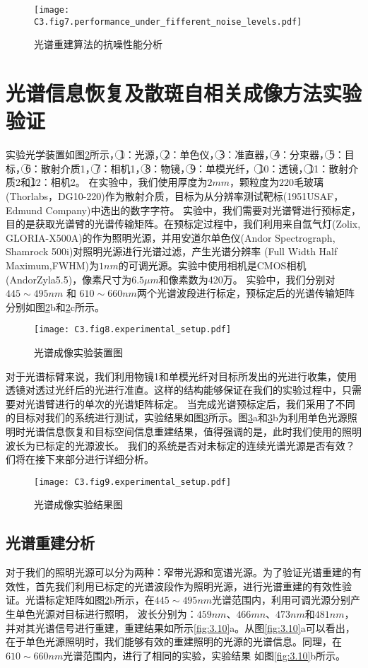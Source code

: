 \begin{figure}[htp]
	\centering
	\texttt{[image: C3.fig7.performance\_under\_fifferent\_noise\_levels.pdf]}
	\caption{光谱重建算法的抗噪性能分析}
	\label{fig:3.7}
\end{figure}

\section{光谱信息恢复及散斑自相关成像方法实验验证}
实验光学装置如图\ref{fig:3.8}所示，\textcircled{1}：光源，\textcircled{2}：单色仪，\textcircled{3}：准直器，\textcircled{4}：分束器，\textcircled{5}：目标，\textcircled{6}：散射介质1，\textcircled{7}：相机1，\textcircled{8}：物镜，\textcircled{9}：单模光纤，
\textcircled{10}：透镜，\textcircled{11}：散射介质2和\textcircled{12}：相机2。
在实验中，我们使用厚度为$2mm$，颗粒度为$220$毛玻璃(Thorlabs，DG10-220)作为散射介质，目标为从分辨率测试靶标(1951USAF，Edmund Company)中选出的数字字符。
实验中，我们需要对光谱臂进行预标定，目的是获取光谱臂的光谱传输矩阵。在预标定过程中，我们利用来自氙气灯(Zolix, GLORIA-X500A)的作为照明光源，并用安道尔单色仪(Andor Spectrograph, Shamrock 500i)对照明光源进行光谱过滤，产生光谱分辨率
(Full Width Half Maximum,FWHM)为$1 nm$的可调光源。实验中使用相机是CMOS相机(AndorZyla5.5)，像素尺寸为$6.5\mu m$和像素数为420万。
实验中，我们分别对$445 \sim 495nm$ 和 $610 \sim 660nm$两个光谱波段进行标定，预标定后的光谱传输矩阵分别如图\ref{fig:3.8}b和\ref{fig:3.8}c所示。
\begin{figure}[htp]
	\centering
	\texttt{[image: C3.fig8.experimental\_setup.pdf]}
	\caption{光谱成像实验装置图}
	\label{fig:3.8}
\end{figure}
对于光谱标臂来说，我们利用物镜1和单模光纤对目标所发出的光进行收集，使用透镜对透过光纤后的光进行准直。这样的结构能够保证在我们的实验过程中，只需要对光谱臂进行的单次的光谱矩阵标定。
当完成光谱预标定后，我们采用了不同的目标对我们的系统进行测试，实验结果如图\ref{fig:3.9}所示。图\ref{fig:3.9}a和\ref{fig:3.9}b为利用单色光源照明时光谱信息恢复和目标空间信息重建结果，值得强调的是，此时我们使用的照明波长为已标定的光源波长。
我们的系统是否对未标定的连续光谱光源是否有效？们将在接下来部分进行详细分析。

\begin{figure}[htp]
	\centering
	\texttt{[image: C3.fig9.experimental\_setup.pdf]}
	\caption{光谱成像实验结果图}
	\label{fig:3.9}
\end{figure}

\subsection{光谱重建分析}
对于我们的照明光源可以分为两种：窄带光源和宽谱光源。为了验证光谱重建的有效性，首先我们利用已标定的光谱波段作为照明光源，进行光谱重建的有效性验证。光谱标定矩阵如图\ref{fig:3.8}b所示，在$445 \sim 495nm$光谱范围内，利用可调光源分别产生单色光源对目标进行照明，
波长分别为：$459nm$、$466mn$、$473nm$和$481nm$，并对其光谱信号进行重建，重建结果如所示\ref{fig:3.10}a。从图\ref{fig:3.10}a可以看出，在于单色光源照明时，我们能够有效的重建照明的光源的光谱信息。同理，在$610 \sim 660nm$光谱范围内，进行了相同的实验，实验结果
如图\ref{fig:3.10}b所示。


